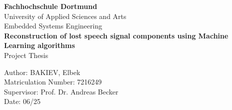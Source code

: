
\begin{titlepage}
    \centering
    {\LARGE \textbf{Fachhochschule Dortmund}\\
    University of Applied Sciences and Arts\\[0.2cm]
    Embedded Systems Engineering}\\[1cm]

    \vfill
    {\Huge \textbf{Reconstruction of lost speech signal components using Machine Learning algorithms}}\\[0.5cm]
    {\Large Project Thesis}\\

    \vfill
    \begin{flushleft}
        Author: \hfill BAKIEV, Elbek\\[0.2cm]
        Matriculation Number: \hfill 7216249\\[1cm]

        Supervisor: \hfill Prof. Dr. Andreas Becker\\[0.2cm]

        Date: \hfill 06/25
    \end{flushleft}
\end{titlepage}
